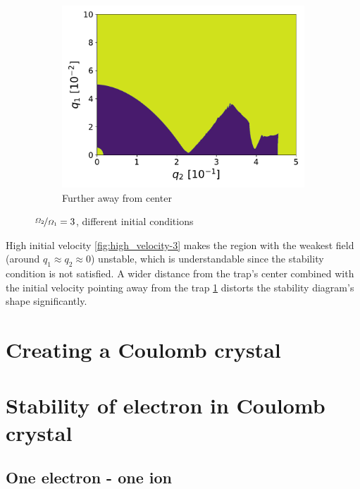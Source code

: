 \begin{figure}[H]
\begin{subfigure}{.3\textwidth}
  \includegraphics[width=\linewidth]{img/0_ions_1_electrons_q1_0.0-0.1_q2_0.0-0.5_960x960_3.pdf}  
  \caption{Further away from center}
  \label{fig:large_radius-3}
\end{subfigure}
\caption{$\nicefrac{\Omega_2}{\Omega_1} = 3$, different initial conditions}
\label{fig:init-conds-eta=3}
\end{figure}

High initial velocity \ref{fig:high_velocity-3} makes the region with the weakest field (around $q_1 \approx q_2 \approx 0$) unstable, which is understandable since the stability condition  is not satisfied. A wider distance from the trap's center combined with the initial velocity pointing away from the trap \ref{fig:large_radius-3} distorts the stability diagram's shape significantly. 


\section{Creating a Coulomb crystal}

\section{Stability of electron in Coulomb crystal}
\subsection{One electron - one ion}
